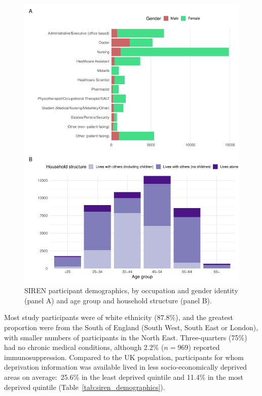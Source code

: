 \begin{figure}[htbp!]
    \centering
    \includegraphics[width=\textwidth]{occupation_household.pdf}
    \caption[SIREN participant demographics, by occupation and gender identity and age group and household structure]{SIREN participant demographics, by occupation and gender identity (panel A) and age group and household structure (panel B).}\label{fig:occupation_household}
\end{figure}

Most study participants were of white ethnicity (87.8\%), and the greatest proportion were from the South of England (South West, South East or London), with smaller numbers of participants in the North East. Three-quarters (75\%) had no chronic medical conditions, although 2.2\% ($n = 969$) reported immunosuppression. Compared to the UK population, participants for whom deprivation information was available lived in less socio-economically deprived areas on average:\ 25.6\% in the least deprived quintile and 11.4\% in the most deprived quintile (Table~\ref{tab:siren_demographics}).

